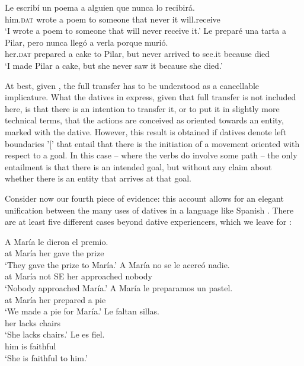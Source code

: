 \documentclass[output=paper,colorlinks,citecolor=brown,nonflat]{langsci/langscibook}
\begin{document}
\ea%
    \label{ex:fabregas:23}
    \ea\label{ex:fabregas:23a}
    \gll    Le escribí un poema a alguien que nunca lo recibirá.\\
            {him.}\textsc{dat} {wrote} {a} {poem} {to} {someone} {that} {never} {it} {will.receive}\\
    \glt `I wrote a poem to someone that will never receive it.'
    \ex\label{ex:fabregas:23b}
    \gll    Le preparé una tarta a Pilar, pero nunca llegó a verla porque murió.\\
            {her.}\textsc{dat}   {prepared} {a} {cake} {to} {Pilar,} {but}  {never}  {arrived} {to} {see.it} {because} {died}\\
    \glt `I made Pilar a cake, but she never saw it because she died.'
    \z
\z

At best, given , the full transfer has to be understood as a cancellable implicature. What the datives in  express, given that full transfer is not included here, is that there is an intention to transfer it, or to put it in slightly more technical terms, that the actions are conceived as oriented towards an entity, marked with the dative. However, this result is obtained if datives denote left boundaries '[' that entail that there is the initiation of a movement oriented with respect to a goal. In this case – where the verbs do involve some path – the only entailment is that there is an intended goal, but without any claim about whether there is an entity that arrives at that goal.

Consider now our fourth piece of evidence: this account allows for an elegant unification between the many uses of datives in a language like Spanish \citep{RAEASALE2009}. There are at least five different cases beyond dative experiencers, which we leave for :

\ea%
    \label{ex:fabregas:24}
    \ea\label{ex:fabregas:24a}
    \gll    A María le     dieron el   premio.\\
            {at} {María} {her}   {gave}    {the}  {prize}\\
    \glt `They gave the prize to María.' 
    \ex\label{ex:fabregas:24b}
    \gll    A María  no  se  le   acercó      nadie.\\
            {at} {María} {not} {SE} {her} {approached} {nobody}\\
    \glt `Nobody approached María.'
    \ex\label{ex:fabregas:24c}
    \gll    A María  le   preparamos un pastel.\\
            {at} {María} {her}   {prepared}      {a}   {pie}\\
    \glt `We made a pie for María.'
    \ex\label{ex:fabregas:24d}
    \gll    Le  faltan sillas.\\
            {her} {lacks}  {chairs}\\
    \glt `She lacks chairs.'
    \ex\label{ex:fabregas:24e}
    \gll    Le   es fiel.\\
            {him} {is}  {faithful}\\
    \glt `She is faithful to him.'
    \z
\z
\end{document}
